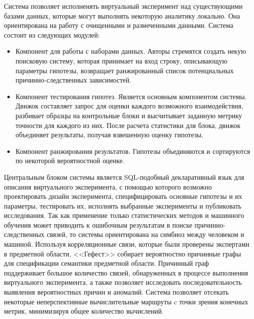 Система позволяет исполненять виртуальный эксперимент над существующими базами данных, которые могут выполнять некоторую аналитику локально. Она ориентирована на работу с очищенными и размеченными данными. Система состоит из следующих модулей:
\begin{itemize}
    \item Компонент для работы с наборами данных. Авторы стремятся создать некую поисковую систему, которая принимает на вход строку, описывающую параметры гипотезы, возвращает ранжированный список потенциальных причинно-следственных зависимостей.
    \item Компонент тестирования гипотез. Является основным компонентом системы. Движок составляет запрос для оценки каждого возможного взаимодействия, разбивает образцы на контрольные блоки и высчитывает заданную метрику точности для каждого из них. После расчета статистики для блока, движок объединяет результаты, получая взвешенную оценку гипотезы.
    \item Компонент ранжирования результатов. Гипотезы объединяются и сортируются по некоторой вероятностной оценке.
\end{itemize}

Центральным блоком системы является SQL-подобный декларативный язык для описания виртуального эксперимента, с помощью которого возможно проектировать дизайн эксперимента, специфицировать основные гипотезы и их параметры, тестировать их, исполнять выбранные эксперименты и публиковать
исследования. Так как применение только статистических методов и машинного обучения может приводить к ошибочным результатам в поиске причинно-следственных связей, то системы ориентирована на симбиоз между человеком и машиной. Используя корреляционные связи, которые были проверены экспертами в предметной области, <<Гефест>> собирает вероятностно причинные графы для спецификации семантики предметной области. Причинный граф поддерживает большое количество связей, обнаруженных в процессе выполнения виртуального эксперимента, а также позволяет исследовать последовательность выявления вероятностных причин и аномалий. Система позволяет отсекать некоторые неперспективные вычислительные маршруты c точки зрения конечных метрик, минимизируя общее количество вычислений.

